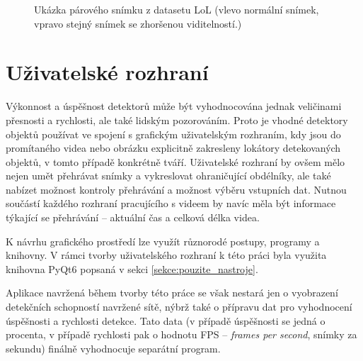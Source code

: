 \begin{figure}[H]
  \begin{center}
  \label{obrazek:loldataset}
  \caption{Ukázka párového snímku z datasetu LoL (vlevo normální snímek, vpravo stejný snímek se zhoršenou viditelností.)}
  \end{center}
\end{figure}
 
\section{Uživatelské rozhraní}
Výkonnost a úspěšnost detektorů může být vyhodnocována jednak veličinami přesnosti a rychlosti, ale také lidským pozorováním. Proto je vhodné detektory objektů používat ve spojení s grafickým uživatelským rozhraním, kdy jsou do promítaného videa nebo obrázku explicitně zakresleny lokátory detekovaných objektů, v tomto případě konkrétně tváří. Uživatelské rozhraní by ovšem mělo nejen umět přehrávat snímky a vykreslovat ohraničující obdélníky, ale také nabízet možnost kontroly přehrávání a možnost výběru vstupních dat. Nutnou součástí každého rozhraní pracujícího s videem by navíc měla být informace týkající se přehrávání -- aktuální čas a celková délka videa.

K návrhu grafického prostředí lze využít různorodé postupy, programy a knihovny. V rámci tvorby uživatelského rozhraní k této práci byla využita knihovna PyQt6 popsaná v sekci \ref{sekce:pouzite_nastroje}.

Aplikace navržená během tvorby této práce se však nestará jen o vyobrazení detekčních schopností navržené sítě, nýbrž také o přípravu dat pro vyhodnocení úspěšnosti a rychlosti detekce. Tato data (v případě úspěšnosti se jedná o procenta, v případě rychlosti pak o hodnotu FPS -- \emph{frames per second}, snímky za sekundu) finálně vyhodnocuje separátní program.

